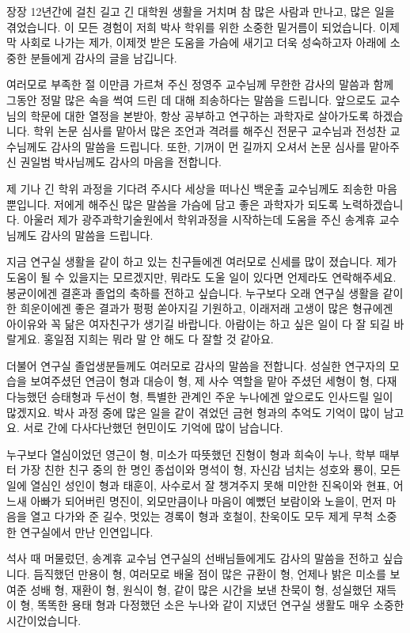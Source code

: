 장장 12년간에 걸친 길고 긴 대학원 생활을 거치며 참 많은 사람과 만나고, 많은 일을 겪었습니다. 이 모든 경험이 저희 박사 학위를 위한 소중한 밑거름이 되었습니다. 이제 막 사회로 나가는 제가, 이제껏 받은 도움을 가슴에 새기고 더욱 성숙하고자 아래에 소중한 분들에게 감사의 글을 남깁니다. 

여러모로 부족한 절 이만큼 가르쳐 주신 정영주 교수님께 무한한 감사의 말씀과 함께 그동안 정말 많은 속을 썩여 드린 데 대해 죄송하다는 말씀을 드립니다. 앞으로도 교수님의 학문에 대한 열정을 본받아, 항상 공부하고 연구하는 과학자로 살아가도록 하겠습니다. 학위 논문 심사를 맡아서 많은 조언과 격려를 해주신 전문구 교수님과 전성찬 교수님께도 감사의 말씀을 드립니다. 또한, 기꺼이 먼 길까지 오셔서 논문 심사를 맡아주신 권일범 박사님께도 감사의 마음을 전합니다.

제 기나 긴 학위 과정을 기다려 주시다 세상을 떠나신 백운출 교수님께도 죄송한 마음뿐입니다. 저에게 해주신 많은 말씀을 가슴에 담고 좋은 과학자가 되도록 노력하겠습니다. 아울러 제가 광주과학기술원에서 학위과정을 시작하는데 도움을 주신 송계휴 교수님께도 감사의 말씀을 드립니다.

지금 연구실 생활을 같이 하고 있는 친구들에겐 여러모로 신세를 많이 졌습니다. 제가 도움이 될 수 있을지는 모르겠지만, 뭐라도 도울 일이 있다면 언제라도 연락해주세요. 봉균이에겐 결혼과 졸업의 축하를 전하고 싶습니다. 누구보다 오래 연구실 생활을 같이 한 희운이에겐 좋은 결과가 펑펑 쏟아지길 기원하고, 이래저래 고생이 많은 형규에겐 아이유와 꼭 닮은 여자친구가 생기길 바랍니다. 아람이는 하고 싶은 일이 다 잘 되길 바랄게요. 홍일점 지희는 뭐라 말 안 해도 다 잘할 것 같아요.

더불어 연구실 졸업생분들께도 여러모로 감사의 말씀을 전합니다. 성실한 연구자의 모습을 보여주셨던 연금이 형과 대승이 형, 제 사수 역할을 맡아 주셨던 세형이 형, 다재다능했던 승태형과 두선이 형, 특별한 관계인 주운 누나에겐 앞으로도 인사드릴 일이 많겠지요. 박사 과정 중에 많은 일을 같이 겪었던 금현 형과의 추억도 기억이 많이 남고요. 서로 간에 다사다난했던 현민이도 기억에 많이 남습니다.

누구보다 열심이었던 영근이 형, 미소가 따뜻했던 진형이 형과 희숙이 누나, 학부 때부터 가장 친한 친구 중의 한 명인 종섭이와 명석이 형, 자신감 넘치는 성호와 룡이, 모든 일에 열심인 성인이 형과 태훈이, 사수로서 잘 챙겨주지 못해 미안한 진옥이와 현표, 어느새 아빠가 되어버린 명진이, 외모만큼이나 마음이 예뻤던 보람이와 노을이, 먼저 마음을 열고 다가와 준 길수, 멋있는 경록이 형과 호철이, 찬욱이도 모두 제게 무척 소중한 연구실에서 만난 인연입니다.

석사 때 머물렀던, 송계휴 교수님 연구실의 선배님들에게도 감사의 말씀을 전하고 싶습니다. 듬직했던 만용이 형, 여러모로 배울 점이 많은 규환이 형, 언제나 밝은 미소를 보여준 성배 형, 재환이 형, 원식이 형, 같이 많은 시간을 보낸 찬묵이 형, 성실했던 재득이 형, 똑똑한 용태 형과 다정했던 소은 누나와 같이 지냈던 연구실 생활도 매우 소중한 시간이었습니다.

